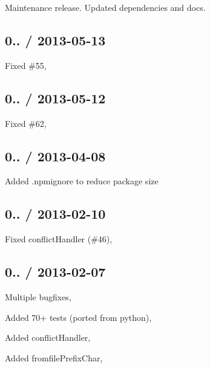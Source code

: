 
\begin{DoxyItemize}
\item Maintenance release. Updated dependencies and docs.
\end{DoxyItemize}

\subsection*{0.. / 2013-\/05-\/13 }


\begin{DoxyItemize}
\item Fixed \#55, 
\end{DoxyItemize}

\subsection*{0.. / 2013-\/05-\/12 }


\begin{DoxyItemize}
\item Fixed \#62, 
\end{DoxyItemize}

\subsection*{0.. / 2013-\/04-\/08 }


\begin{DoxyItemize}
\item Added {\ttfamily .npmignore} to reduce package size
\end{DoxyItemize}

\subsection*{0.. / 2013-\/02-\/10 }


\begin{DoxyItemize}
\item Fixed conflict\+Handler (\#46), 
\end{DoxyItemize}

\subsection*{0.. / 2013-\/02-\/07 }


\begin{DoxyItemize}
\item Multiple bugfixes, 
\item Added 70+ tests (ported from python), 
\item Added conflict\+Handler, 
\item Added fromfile\+Prefix\+Char, 
\end{DoxyItemize}

